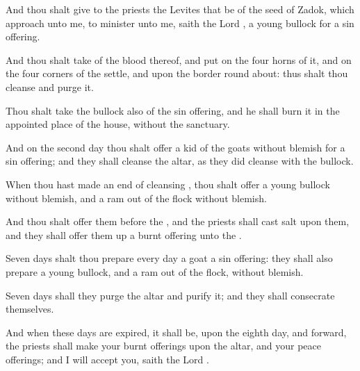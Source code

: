 {And thou shalt
give to the
priests the
Levites that be of the
seed of
Zadok, which
approach unto me, to
minister unto me,
saith the
Lord
{}, a
young
bullock for a sin
offering.

And thou shalt
take of the
blood thereof, and
put
{} on the
four
horns of it, and on the
four
corners of the
settle, and upon the
border round
about: thus shalt thou
cleanse and
purge it.

Thou shalt
take the
bullock also of the sin
offering, and he shall
burn it in the appointed
place of the
house,
without the
sanctuary.

And on the
second
day thou shalt
offer a
kid of the
goats without
blemish for a sin
offering; and they shall
cleanse the
altar, as they did
cleanse
{} with the
bullock.

When thou hast made an
end of
cleansing
{}, thou shalt
offer a
young
bullock without
blemish, and a
ram out of the
flock without
blemish.

And thou shalt
offer them
before the
{}, and the
priests shall
cast
salt upon them, and they shall offer them
up
{} a burnt
offering unto the
{}.

Seven
days shalt thou
prepare every
day a
goat
{} a sin
offering: they shall also
prepare a
young
bullock, and a
ram out of the
flock, without
blemish.

Seven
days shall they
purge the
altar and
purify it; and they shall consecrate
themselves.

And when these
days are
expired, it shall be,
{} upon the
eighth
day, and
{}
forward, the
priests shall
make your burnt
offerings upon the
altar, and your peace
offerings; and I will
accept you,
saith the
Lord
{}.




\par }
